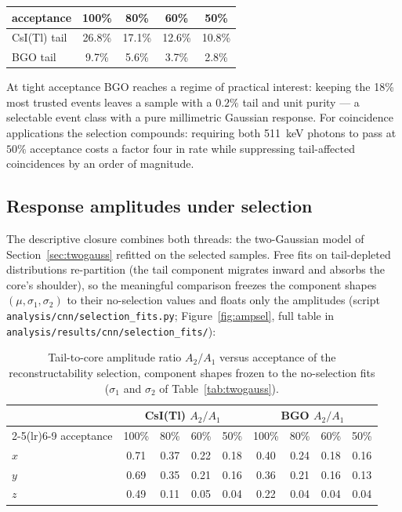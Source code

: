 \documentclass[11pt,a4paper]{article}
\newcommand{\code}[1]{\texttt{#1}}
\newcommand{\csitl}{CsI(Tl)}
\begin{document}
\begin{center}
\begin{tabular}{lcccc}
  \toprule
  acceptance & 100\% & 80\% & 60\% & 50\% \\
  \midrule
  \csitl{} tail & 26.8\% & 17.1\% & 12.6\% & 10.8\% \\
  BGO tail      & 9.7\%  & 5.6\%  & 3.7\%  & 2.8\% \\
  \bottomrule
\end{tabular}
\end{center}

At tight acceptance BGO reaches a regime of practical interest: keeping the
18\% most trusted events leaves a sample with a $0.2\%$ tail and unit purity
--- a selectable event class with a pure millimetric Gaussian response. For
coincidence applications the selection compounds: requiring both 511~keV
photons to pass at $50\%$ acceptance costs a factor four in rate while
suppressing tail-affected coincidences by an order of magnitude.

\subsection{Response amplitudes under selection}

The descriptive closure combines both threads: the two-Gaussian model of
Section~\ref{sec:twogauss} refitted on the selected samples. Free fits on
tail-depleted distributions re-partition (the tail component migrates inward
and absorbs the core's shoulder), so the meaningful comparison freezes the
component shapes $(\mu, \sigma_1, \sigma_2)$ to their no-selection values and
floats only the amplitudes (script \code{analysis/cnn/selection\_fits.py};
Figure~\ref{fig:ampsel}, full table in
\code{analysis/results/cnn/selection\_fits/}):

\begin{table}[htbp]
\centering
\begin{tabular}{lcccccccc}
  \toprule
  & \multicolumn{4}{c}{\csitl{} \quad $A_2/A_1$} &
    \multicolumn{4}{c}{BGO \quad $A_2/A_1$} \\
  \cmidrule(lr){2-5}\cmidrule(lr){6-9}
  acceptance & 100\% & 80\% & 60\% & 50\% & 100\% & 80\% & 60\% & 50\% \\
  \midrule
  $x$ & 0.71 & 0.37 & 0.22 & 0.18 & 0.40 & 0.24 & 0.18 & 0.16 \\
  $y$ & 0.69 & 0.35 & 0.21 & 0.16 & 0.36 & 0.21 & 0.16 & 0.13 \\
  $z$ & 0.49 & 0.11 & 0.05 & 0.04 & 0.22 & 0.04 & 0.04 & 0.04 \\
  \bottomrule
\end{tabular}
\caption{Tail-to-core amplitude ratio $A_2/A_1$ versus acceptance of the
reconstructability selection, component shapes frozen to the no-selection
fits ($\sigma_1$ and $\sigma_2$ of Table~\ref{tab:twogauss}).}
\label{tab:ampsel}
\end{table}
\end{document}
